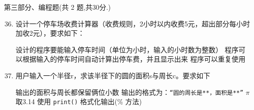 \documentclass[11pt]{ctexart}
\begin{document}
    {\noindent\heiti 第三部分、编程题(共 2 题,共30分.)}
    \begin{enumerate}
        \setcounter{enumi}{35}
        
        \item 设计一个停车场收费计算器（收费规则，2小时以内收费5元，超出部分每小时加收2元），要求如下：
        
        \begin{tasks}[label=(\arabic*)]
            \task 设计的程序要能输入停车时间（单位为小时，输入的小时数为整数）
            \task 程序可以根据输入的停车时间自动计算出停车费，并且显示出来
            \task 程序可以重复使用
        \end{tasks}
        \vfill

        \item 用户输入一个半径r，求该半径下的圆的面积s与周长c。要求如下
        
        \begin{tasks}[label=\arabic*.]
            \task 输出的面积与周长都保留俩位小数
            \task 输出的格式为：\lstinline!“圆的周长是**，面积是**”!
            \task $\pi$取3.14
            \task 使用 \lstinline!print()! 格式化输出(\% 方法)
        \end{tasks}
        \vfill
    \end{enumerate}
\end{document}
